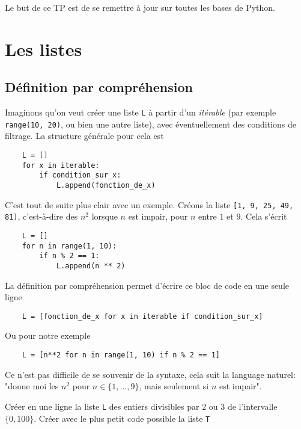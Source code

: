 

Le but de ce TP est de se remettre à jour sur toutes les bases de Python.

\section{Les listes}

\subsection{Définition par compréhension}

Imaginons qu'on veut créer une liste \texttt{L} à partir d'un \textit{itérable} (par exemple \texttt{range(10, 20)}, ou bien une autre liste), avec éventuellement des conditions de filtrage. La structure générale pour cela est 

\begin{verbatim}
    L = []
    for x in iterable:
        if condition_sur_x:
            L.append(fonction_de_x)
\end{verbatim}

C'est tout de suite plus clair avec un exemple. Créons la liste \texttt{[1, 9, 25, 49, 81]}, c'est-à-dire des $ n^2 $ lorsque $ n $ est impair, pour $ n $ entre $ 1 $ et $ 9 $. Cela s'écrit 

\begin{verbatim}
    L = []
    for n in range(1, 10):
        if n % 2 == 1:
            L.append(n ** 2)
\end{verbatim}

La définition par compréhension permet d'écrire ce bloc de code en une seule ligne 

\begin{verbatim}
    L = [fonction_de_x for x in iterable if condition_sur_x]
\end{verbatim}

Ou pour notre exemple 

\begin{verbatim}
    L = [n**2 for n in range(1, 10) if n % 2 == 1]
\end{verbatim}

Ce n'est pas difficile de se souvenir de la syntaxe, cela suit la language naturel: "donne moi les $ n^2 $ pour $ n \in \{1, \ldots, 9\} $, mais seulement si $ n $ est impair".

\quessques Créer en une ligne la liste \texttt{L} des entiers divisibles par $ 2 $ ou $ 3 $ de l'intervalle $ \{0, 100\} $.
\ssques Créer avec le plus petit code possible la liste \texttt{T}


